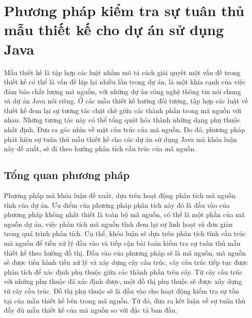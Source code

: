 \documentclass[12pt]{report}
\begin{document}
\chapter{Phương pháp kiểm tra sự tuân thủ mẫu thiết kế cho dự án sử dụng Java}
\label{chap:3}
\noindent Mẫu thiết kế là tập hợp các luật nhằm mô tả cách giải quyết một vấn đề trong thiết kế có thể là vấn đề lặp lại nhiều lần trong dự án, là một khía cạnh của việc đảm bảo chất lượng mã nguồn, với những dự án công nghệ thông tin nói chung và dự án Java nói riêng. Ở các mẫu thiết kế hướng đối tượng, tập hợp các luật về thiết kế đem lại sự tương tác chặt chẽ giữa các thành phần trong mã nguồn với nhau. Những tương tác này có thể tổng quát hóa thành những dạng phụ thuộc nhất định. Đưa ra góc nhìn về mặt cấu trúc của mã nguồn. Do đó, phương pháp phát hiện sự tuân thủ mẫu thiết kế cho các dự án sử dụng Java mà khóa luận này đề xuất, sẽ đi theo hướng phân tích cấu trúc của mã nguồn.

\section{Tổng quan phương pháp}
Phương pháp mà khóa luận đề xuất, dựa trên hoạt động phân tích mã nguồn tĩnh của dự án. Ưu điểm của phương pháp phân tích này đó là đầu vào của phương pháp không nhất thiết là toàn bộ mã nguồn, có thể là một phần của mã nguồn dự án, việc phân tích mã nguồn tĩnh đem lại sự linh hoạt và đơn giản trong quá trình phân tích. Cụ thể, khóa luận sẽ dựa trên phân tích tĩnh cấu trúc mã nguồn để tiền xử lý đầu vào và tiếp cận bài toán kiểm tra sự tuân thủ mẫu thiết kế theo hướng đồ thị.
Đầu vào của phương pháp sẽ là mã nguồn, mã nguồn sẽ được tiến hành tiền xử lý và xây dựng cây cấu trúc, cây cấu trúc tiếp tục được phân tích để xác định phụ thuộc giữa các thành phần trên cây. Từ cây cấu trúc với những phụ thuộc đã xác định được, một đồ thị phụ thuộc sẽ được xây dựng từ cây cấu trúc. Đồ thị phụ thuộc sẽ là đầu vào cho hoạt động kiểm tra sự tồn tại của mẫu thiết kế bên trong mã nguồn. Từ đó, đưa ra kết luận về sự tuân thủ đầy đủ mẫu thiết kế của mã nguồn so với đặc tả ban đầu.
\end{document}
